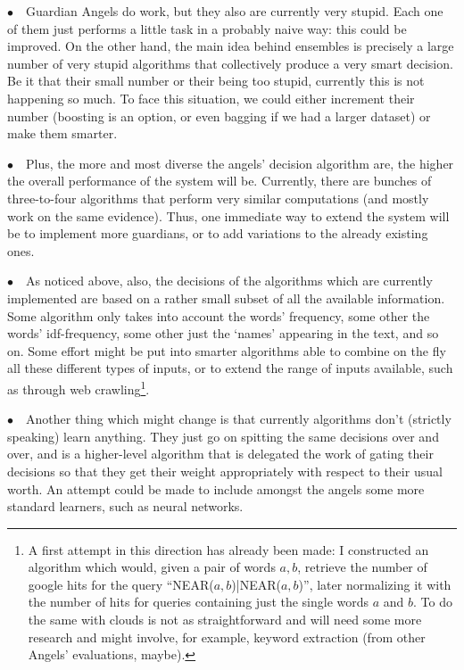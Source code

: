 \documentclass[11pt]{article}
\begin{document}
$\bullet \quad$Guardian Angels do work, but they also are currently very stupid. Each one of them just performs a little task in a probably naive way: this could be improved. On the other hand, the main idea behind ensembles is precisely a large number of very stupid algorithms that collectively produce a very smart decision. Be it that their small number or their being too stupid, currently this is not happening so much. To face this situation, we could either increment their number (boosting is an option, or even bagging if we had a larger dataset) or make them smarter.

$\bullet \quad$Plus, the more and most diverse the angels' decision algorithm are, the higher the overall performance of the system will be. Currently, there are bunches of three-to-four algorithms that perform very similar computations (and mostly work on the same evidence). Thus, one immediate way to extend the system will be to implement more guardians, or to add variations to the already existing ones.

$\bullet \quad$As noticed above, also, the decisions of the algorithms which are currently implemented are based on a rather small subset of all the available information. Some algorithm only takes into account the words' frequency, some other the words' idf-frequency, some other just the `names' appearing in the text, and so on. Some effort might be put into smarter algorithms able to combine on the fly all these different types of inputs, or to extend the range of inputs available, such as through web crawling\footnote{
A first attempt in this direction has already been made: I constructed an algorithm which would, given a pair of words $a,b$, retrieve the number of google hits for the query ``NEAR($a,b$)|NEAR($a,b$)'', later normalizing it with the number of hits for queries containing just the single words $a$ and $b$. To do the same with clouds is not as straightforward and will need some more research and might involve, for example, keyword extraction (from other Angels' evaluations, maybe).}.

$\bullet \quad$Another thing which might change is that currently algorithms don't (strictly speaking) learn anything. They just go on spitting the same decisions over and over, and is a higher-level algorithm that is delegated the work of gating their decisions so that they get their weight appropriately with respect to their usual worth. An attempt could be made to include amongst the angels some more standard learners, such as neural networks.
\end{document}
